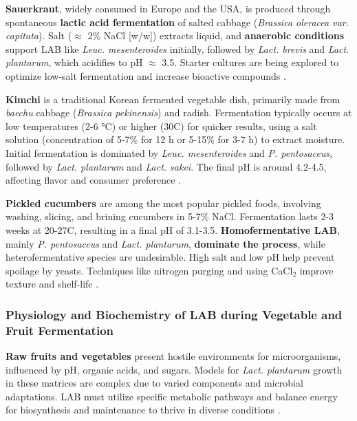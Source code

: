 \textbf{Sauerkraut}, widely consumed in Europe and the USA, is produced through spontaneous \textbf{lactic acid fermentation} of salted cabbage (\textit{Brassica oleracea var. capitata}). Salt ($\approx$ 2\% NaCl [w/w]) extracts liquid, and \textbf{anaerobic conditions} support LAB like \textit{Leuc. mesenteroides} initially, followed by \textit{Lact. brevis} and \textit{Lact. plantarum}, which acidifies to pH $\approx$ 3.5. Starter cultures are being explored to optimize low-salt fermentation and increase bioactive compounds \cite*{L8-VegFruit}.

\textbf{Kimchi} is a traditional Korean fermented vegetable dish, primarily made from \textit{baechu} cabbage (\textit{Brassica pekinensis}) and radish. Fermentation typically occurs at low temperatures (2-6 °C) or higher (30\textdegree C) for quicker results, using a salt solution (concentration of 5-7\% for 12 h or 5-15\% for 3-7 h) to extract moisture. Initial fermentation is dominated by \textit{Leuc. mesenteroides} and \textit{P. pentosaceus}, followed by \textit{Lact. plantarum} and \textit{Lact. sakei}. The final pH is around 4.2-4.5, affecting flavor and consumer preference \cite*{L8-VegFruit}.

\textbf{Pickled cucumbers} are among the most popular pickled foods, involving washing, slicing, and brining cucumbers in 5-7\% NaCl. Fermentation lasts 2-3 weeks at 20-27\textdegree C, resulting in a final pH of 3.1-3.5. \textbf{Homofermentative LAB}, mainly \textit{P. pentosaceus} 
and \textit{Lact. plantarum}, \textbf{dominate the process}, while heterofermentative species are undesirable. High salt and low pH help prevent spoilage by yeasts. Techniques like nitrogen purging and using CaCl$_2$ improve texture and shelf-life \cite*{L8-VegFruit}.

\subsubsection{Physiology and Biochemistry of LAB during Vegetable and Fruit Fermentation}
\textbf{Raw fruits and vegetables} present hostile environments for microorganisms, influenced by pH, organic acids, and sugars. Models for \textit{Lact. plantarum} growth in these matrices are complex due to varied components and microbial adaptations. LAB must utilize specific metabolic pathways and balance energy for biosynthesis and maintenance to thrive in diverse conditions \cite*{L8-VegFruit}.

